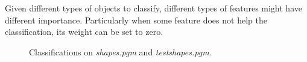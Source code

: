 \documentclass[paper=a4, fontsize=11pt]{scrartcl}
\begin{document}
Given different types of objects to classify, different types of features might have different importance.
Particularly when some feature does not help the classification, its weight can be set to zero. 

\begin{figure}[h]
\centering
{} 
\caption{Classifications on \emph{shapes.pgm} and \emph{testshapes.pgm}.}
\label{fig:class:01}
\end{figure}
\end{document}
